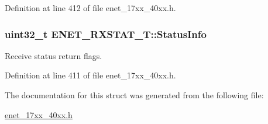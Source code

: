 Definition at line 412 of file enet\+\_\+17xx\+\_\+40xx.\+h.

\subsubsection[{\texorpdfstring{Status\+Info}{StatusInfo}}]{\setlength{\rightskip}{0pt plus 5cm}uint32\+\_\+t E\+N\+E\+T\+\_\+\+R\+X\+S\+T\+A\+T\+\_\+\+T\+::\+Status\+Info}\hypertarget{structENET__RXSTAT__T_a0d2de29791ff4358c5cc4dedd694857d}{}\label{structENET__RXSTAT__T_a0d2de29791ff4358c5cc4dedd694857d}
Receive status return flags. 

Definition at line 411 of file enet\+\_\+17xx\+\_\+40xx.\+h.



The documentation for this struct was generated from the following file\+:\begin{DoxyCompactItemize}
\item 
\hyperlink{enet__17xx__40xx_8h}{enet\+\_\+17xx\+\_\+40xx.\+h}\end{DoxyCompactItemize}
